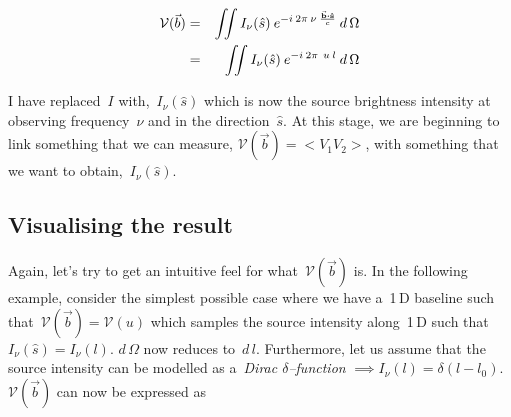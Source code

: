 \documentclass[11pt, a4paper]{article}
\newcommand{\msp}{\mkern \medmuskip}
\begin{document}
\begin{eqnarray}
  \label{eq:21}
  \begin{aligned}
  \mathcal{V}(\vec{b}) &=& \iint I_\nu (\hat{s}) \msp e^{-i \msp 2\pi \msp \nu \msp \frac{\vec{\mathbf{b}} \boldsymbol{\cdot} \mathbf{\hat{s}}}{c}} \msp d\,\Omega \\
                       &=& \iint I_\nu (\hat{s}) \msp e^{-i \msp 2\pi \msp \msp u \msp l} \msp d\,\Omega
  \end{aligned}
\end{eqnarray}

I have replaced~$I$ with,~$I_\nu (\hat{s})$ which is now the source brightness intensity at observing frequency~$\nu $ and in the direction~$\hat{s}$. At this stage, we are beginning to link something that we can measure, $\mathcal{V}(\vec{b}) = <V_1V_2>$, with something that we want to obtain,~$I_\nu (\hat{s})$.


\subsection{Visualising the result}
\label{sec:visualising-result}

Again, let's try to get an intuitive feel for what~$\mathcal{V}(\vec{b})$ is. In the following example, consider the simplest possible case where we have a~1\,D baseline such that~$\mathcal{V}(\vec{b}) = \mathcal{V}(u)$ which samples the source intensity along~1\,D such that~$I_\nu (\hat{s}) = I_\nu (l)$. $d\,\Omega $ now reduces to~$d\, l$. Furthermore, let us assume that the source intensity can be modelled as a~\emph{Dirac $\delta $--function} $\implies I_\nu (l) = \delta(l - l_0)$. $\mathcal{V}(\vec{b})$ can now be expressed as
\end{document}
